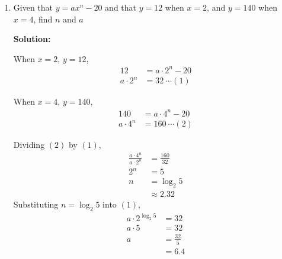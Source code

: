 \documentclass{report}
\newcommand{\sol}{\vspace{0.2cm}\textbf{Solution:}\vspace{0.2cm}}
\begin{document}
\begin{multicols*}{2}
\begin{enumerate}[leftmargin=*]
\begin{enumerate}
\begin{enumerate}
                            \item $\log _9 a$.

                                  \sol{}
                                  \begin{align*}
                                      \log_9 a & = \dfrac{1}{2} \log_3 a \\
                                               & = \dfrac{1}{2} p
                                  \end{align*}

                        \end{enumerate}
                  \item Given that $y=a x^{n}-20$ and that $y=12$ when $x=2$, and $y=140$ when $x=4$,
                        find $n$ and $a$

                        \sol{}

                        When $x=2$, $y=12$,
                        \begin{align*}
                            12            & = a \cdot 2^{n}-20 \\
                            a \cdot 2^{n} & = 32\ \cdots (1)
                        \end{align*}

                        When $x=4$, $y=140$,
                        \begin{align*}
                            140           & = a \cdot 4^{n}-20 \\
                            a \cdot 4^{n} & = 160\ \cdots (2)
                        \end{align*}

                        Dividing $(2)$ by $(1)$,
                        \begin{align*}
                            \frac{a \cdot 4^{n}}{a \cdot 2^{n}} & = \frac{160}{32} \\
                            2^{n}                               & = 5              \\
                            n                                   & = \log_2 5       \\
                                                                & \approx 2.32
                        \end{align*}
                        Substituting $n=\log_2 5$ into $(1)$,
                        \begin{align*}
                            a \cdot 2^{\log_2 5} & = 32           \\
                            a \cdot 5            & = 32           \\
                            a                    & = \frac{32}{5} \\
                                                 & = 6.4
                        \end{align*}
              \end{enumerate}


\end{enumerate}
\end{multicols*}
\end{document}
